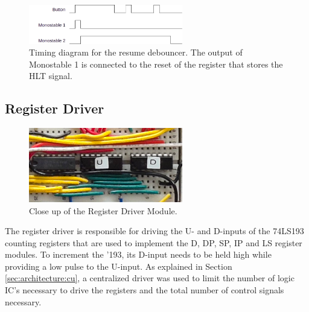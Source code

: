 \begin{figure}[H]
  \centering
  \includegraphics[width=0.6\textwidth]{img/resumedebounce}
  \caption{Timing diagram for the resume debouncer. The output of Monostable 1 is connected to the reset of the register that stores the HLT signal.}
  \label{fig:resumedebounce}
\end{figure}



\newpage\subsection{Register Driver} \label{sec:implementation:registerdriver}
\begin{figure}[H]
  \centering
  \includegraphics[width=0.6\textwidth]{img/registerdrivercloseup}
  \caption{Close up of the Register Driver Module.}
  \label{fig:registerdrivercloseup}
\end{figure}

The register driver is responsible for driving the U- and D-inputs of the 74LS193 counting registers that are used to implement the D, DP, SP, IP and LS register modules. To increment the '193, its D-input needs to be held high while providing a low pulse to the U-input. As explained in Section \ref{sec:architecture:cu}, a centralized driver was used to limit the number of logic IC's necessary to drive the registers and the total number of control signals necessary.

